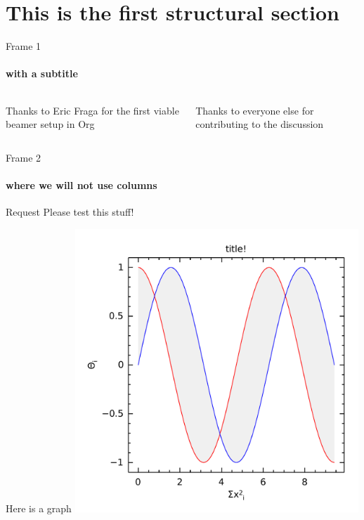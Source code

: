 \documentclass[presentation, bigger]{beamer}
\begin{document}
\section[This is the first structural section]{This is the first structural section}
\label{sec-2}

\begin{frame}[label=sec-2-1]{Frame 1}
\framesubtitle{with a subtitle}

\begin{columns}
\begin{column}{0.5\textwidth}
\begin{block}{Thanks to Eric Fraga}
for the first viable beamer setup in Org
\end{block}
\end{column}

\begin{column}{0.5\textwidth}
\begin{block}{Thanks to everyone else}
for contributing to the discussion
\end{block}
\end{column}
\end{columns}
\end{frame}
\begin{frame}[label=sec-2-2]{Frame 2}
\framesubtitle{where we will not use columns}
\begin{block}{Request}
Please test this stuff!
\end{block}
\end{frame}
\begin{frame}[label=sec-2-3]{Here is a graph}
\includegraphics[width=0.80\textwidth]{example1.pdf}
\end{frame}
\end{document}
